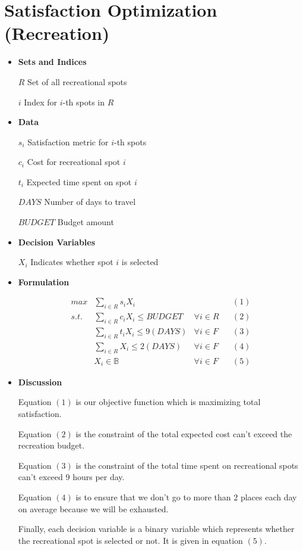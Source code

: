 \documentclass{article}
\newcommand\tabb{\tabto{10em}}
\newcommand\idt{\hspace{2mm}}
\begin{document}
	\pagebreak
	
	\section*{Satisfaction Optimization (Recreation)}
	
	\begin{itemize}
		\item \textbf{Sets and Indices} 
		
		\idt $R$ \tabb Set of all recreational spots
		
		\idt $i$ \tabb Index for $i$-th spots in $R$
		
		\item \textbf{Data}
		
		\idt $s_{i}$ \tabb Satisfaction metric for $i$-th spots
		
		\idt $c_{i}$ \tabb Cost for recreational spot $i$
		
		\idt $t_{i}$ \tabb Expected time spent on spot $i$
		
		\idt $DAYS$ \tabb Number of days to travel
		
		\idt $BUDGET$ \tabb Budget amount
		
		\item \textbf{Decision Variables}
		
		\idt $X_{i}$ \tabb Indicates whether spot $i$ is selected
		
		\item \textbf{Formulation}
		
		\[
		\begin{aligned}
			max & \sum_{i \in R} s_{i}X_{i} & & & (1) \\
			s.t. & \sum_{i \in R} c_{i}X_{i} \le BUDGET & \forall i \in R & & (2) \\
			& \sum_{i \in R} t_{i}X_{i} \le 9 (DAYS) & \forall i \in F & & (3) \\
			& \sum_{i \in R} X_{i} \le 2 (DAYS) & \forall i \in F & & (4) \\
			& X_{i} \in \mathbb{B} & \forall i \in F & & (5)
		\end{aligned}
		\]
		
		\item \textbf{Discussion}
		
		Equation $(1)$ is our objective function which is maximizing total satisfaction.
		
		Equation $(2)$ is the constraint of the total expected cost can't exceed the recreation budget.
		
		Equation $(3)$ is the constraint of the total time spent on recreational spots can't exceed 9 hours per day.
		
		Equation $(4)$ is to ensure that we don't go to more than $2$ places each day on average because we will be exhausted.
		
		Finally, each decision variable is a binary variable which represents whether the recreational spot is selected or not. It is given in equation $(5)$.
		
	\end{itemize}
\end{document}
